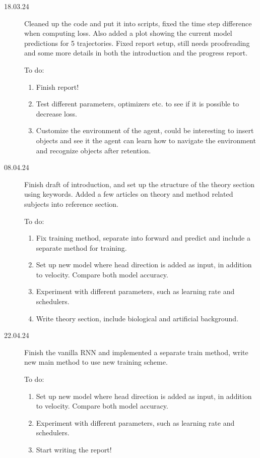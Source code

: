\begin{description}
    \item[18.03.24] Cleaned up the code and put it into scripts, fixed the time step difference when computing loss. Also added a plot showing the current model predictions for 5 trajectories. Fixed report setup, still needs proofreading and some more details in both the introduction and the progress report.

    To do: %
    \begin{enumerate}
        \item Finish report!
        \item Test different parameters, optimizers etc. to see if it is possible to decrease loss. 
        \item Customize the environment of the agent, could be interesting to insert objects and see it the agent can learn how to navigate the environment and recognize objects after retention.
    \end{enumerate}

    \item[08.04.24] Finish draft of introduction, and set up the structure of the theory section using keywords. Added a few articles on theory and method related subjects into reference section.

    To do: %
    \begin{enumerate}
        \item Fix training method, separate into forward and predict and include a separate method for training. 
        \item Set up new model where head direction is added as input, in addition to velocity. Compare both model accuracy.
        \item Experiment with different parameters, such as learning rate and schedulers.
        \item Write theory section, include biological and artificial background.
    \end{enumerate}

    \item[22.04.24] Finish the vanilla RNN and implemented a separate train method, write new main method to use new training scheme.

    To do: %
    \begin{enumerate}
        \item Set up new model where head direction is added as input, in addition to velocity. Compare both model accuracy.
        \item Experiment with different parameters, such as learning rate and schedulers.
        \item Start writing the report!
    \end{enumerate}


\end{description}

